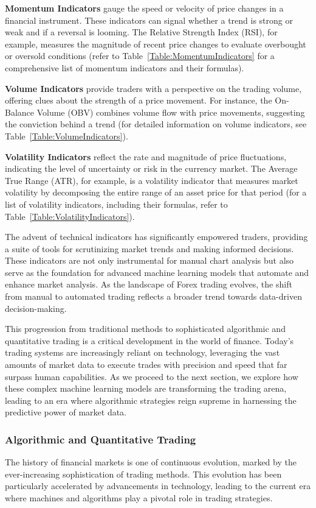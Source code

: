 \textbf{Momentum Indicators} gauge the speed or velocity of price changes in a financial instrument. These indicators can signal whether a trend is strong or weak and if a reversal is looming. The Relative Strength Index (RSI), for example, measures the magnitude of recent price changes to evaluate overbought or oversold conditions (refer to Table~\ref{Table:MomentumIndicators} for a comprehensive list of momentum indicators and their formulas).

\textbf{Volume Indicators} provide traders with a perspective on the trading volume, offering clues about the strength of a price movement. For instance, the On-Balance Volume (OBV) combines volume flow with price movements, suggesting the conviction behind a trend (for detailed information on volume indicators, see Table~\ref{Table:VolumeIndicators}).

\textbf{Volatility Indicators} reflect the rate and magnitude of price fluctuations, indicating the level of uncertainty or risk in the currency market. The Average True Range (ATR), for example, is a volatility indicator that measures market volatility by decomposing the entire range of an asset price for that period (for a list of volatility indicators, including their formulas, refer to Table~\ref{Table:VolatilityIndicators}).

The advent of technical indicators has significantly empowered traders, providing a suite of tools for scrutinizing market trends and making informed decisions. These indicators are not only instrumental for manual chart analysis but also serve as the foundation for advanced machine learning models that automate and enhance market analysis. As the landscape of Forex trading evolves, the shift from manual to automated trading reflects a broader trend towards data-driven decision-making.

This progression from traditional methods to sophisticated algorithmic and quantitative trading is a critical development in the world of finance. Today's trading systems are increasingly reliant on technology, leveraging the vast amounts of market data to execute trades with precision and speed that far surpass human capabilities. As we proceed to the next section, we explore how these complex machine learning models are transforming the trading arena, leading to an era where algorithmic strategies reign supreme in harnessing the predictive power of market data.

\subsubsection{Algorithmic and Quantitative Trading}
The history of financial markets is one of continuous evolution, marked by the ever-increasing sophistication of trading methods. This evolution has been particularly accelerated by advancements in technology, leading to the current era where machines and algorithms play a pivotal role in trading strategies.

